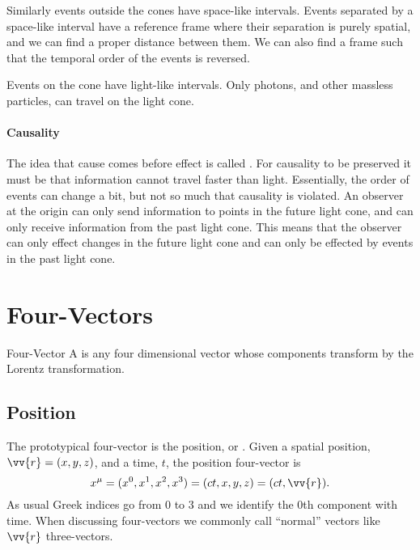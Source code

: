 \documentclass[fleqn]{NotesClass}
\begin{document}
    Similarly events outside the cones have space-like intervals.
    Events separated by a space-like interval have a reference frame where their separation is purely spatial, and we can find a proper distance between them.
    We can also find a frame such that the temporal order of the events is reversed.
    
    Events on the cone have light-like intervals.
    Only photons, and other massless particles, can travel on the light cone.
    
    \subsubsection{Causality}
    The idea that cause comes before effect is called .
    For causality to be preserved it must be that information cannot travel faster than light.
    Essentially, the order of events can change a bit, but not so much that causality is violated.
    An observer at the origin can only send information to points in the future light cone, and can only receive information from the past light cone.
    This means that the observer can only effect changes in the future light cone and can only be effected by events in the past light cone.
    
    \chapter{Four-Vectors}
    \begin{dfn}{Four-Vector}{}
        A  is any four dimensional vector whose components transform by the Lorentz transformation.
    \end{dfn}
    
    \section{Position}
    The prototypical four-vector is the position, or .
    Given a spatial position, \(\vv{r} = (x, y, z)\), and a time, \(t\), the position four-vector is
    \begin{equation}
        x^\mu = (x^0, x^1, x^2, x^3) = (ct, x, y, z) = (ct, \vv{r}).
    \end{equation}
    As usual Greek indices go from 0 to 3 and we identify the 0th component with time.
    When discussing four-vectors we commonly call \enquote{normal} vectors like \(\vv{r}\) three-vectors.
    
\end{document}
